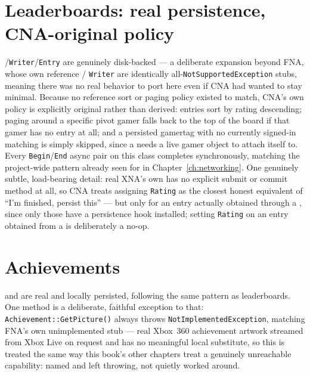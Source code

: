 \section{Leaderboards: real persistence, CNA-original policy}
\label{sec:leaderboards}

/\texttt{Writer}/\texttt{Entry} are genuinely disk-backed --- a
deliberate expansion beyond FNA, whose own reference /%
\texttt{Writer} are identically all-\texttt{NotSupportedException} stubs, meaning there was
no real behavior to port here even if CNA had wanted to stay minimal. Because no reference
sort or paging policy existed to match, CNA's own policy is explicitly original rather than
derived: entries sort by rating descending; paging around a specific pivot gamer falls back
to the top of the board if that gamer has no entry at all; and a persisted gamertag with no
currently signed-in matching  is simply skipped, since a
 needs a live gamer object to attach itself to. Every
\texttt{Begin}/\texttt{End} async pair on this class completes synchronously, matching the
project-wide pattern already seen for  in
Chapter~\ref{ch:networking}. One genuinely subtle, load-bearing detail: real XNA's own
 has no explicit submit or commit method at all, so CNA treats
assigning \texttt{Rating} as the closest honest equivalent of ``I'm finished, persist this''
--- but only for an entry actually obtained through a , since only
those have a persistence hook installed; setting \texttt{Rating} on an entry obtained from a
 is deliberately a no-op.

\section{Achievements}

 and  are real and locally persisted,
following the same pattern as leaderboards. One method is a deliberate, faithful exception to
that: \texttt{Achievement::GetPicture()} always throws \texttt{NotImplementedException},
matching FNA's own unimplemented stub --- real Xbox~360 achievement artwork streamed from
Xbox Live on request and has no meaningful local substitute, so this is treated the same way
this book's other chapters treat a genuinely unreachable capability: named and left throwing,
not quietly worked around.

